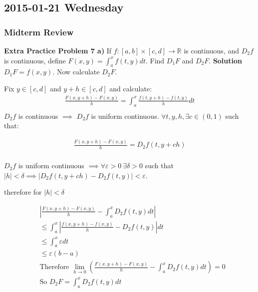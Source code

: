 
\subsection{2015-01-21 Wednesday}
\subsubsection{Midterm Review}
\textbf{Extra Practice Problem 7 a)} If $f: [a, b] \times [c,d] \to \mathbb{R}$ is continuous, and $D_2f$ is continuous, define $F(x, y) = \int_a^x f(t,y)dt$. Find $D_1F$ and $D_2F$.
\newline\newline
\textbf{Solution} $D_1F = f(x, y)$. Now calculate $D_2F$.

Fix $y \in [c,d]$ and $y+h \in [c,d]$ and calculate:
\begin{align*}
\frac{F(x,y+h) - F(x,y)}{h} = \int_a^x \frac{f(t, y+h) - f(t, y)}{h} dt \\
\end{align*}
$D_2f$ is continuous $\implies$ $D_2f$ is uniform continuous. $\forall t, y, h, \exists c \in (0, 1)$ such that:

\begin{align*}
\frac{F(x,y+h) - F(x,y)}{h} = D_2f(t,y+ch) \\
\end{align*}

$D_2f$ is uniform continuous $\implies \forall \varepsilon > 0 \ \exists \delta > 0$ such that $|h| < \delta \implies |D_2f(t, y+ch) - D_2f(t,y)| < \varepsilon$.

therefore for $|h| < \delta$

\begin{align*}
&|\frac{F(x,y+h) - F(x,y)}{h} - \int_a^x D_2f(t,y) dt| \\
&\leq \int_a^x |\frac{f(x,y+h) - f(x,y)}{h} - D_2f(t,y)| dt\\
&\leq \int_a^x \varepsilon dt \\
&\leq \varepsilon (b-a) \\
&\text{Therefore } \lim_{h \to 0} (\frac{F(x,y+h) - F(x,y)}{h} - \int_a^x D_2f(t,y) dt) = 0 \\
&\text{So }D_2F = \int_a^x D_2f(t, y) dt
\end{align*}

